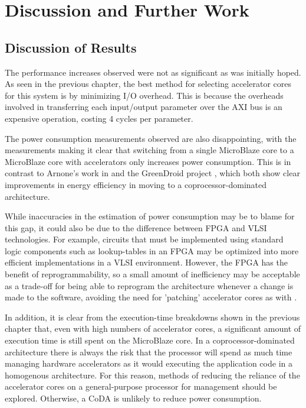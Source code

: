 \documentclass{UoYCSproject}
\begin{document}
\chapter{Discussion and Further Work}

\section{Discussion of Results}

The performance increases observed were not as significant as was initially hoped.
As seen in the previous chapter, the best method for selecting accelerator cores for this system is by minimizing
I/O overhead. This is because the overheads involved in transferring each input/output parameter over the AXI bus is an
expensive operation, costing 4 cycles per parameter.

The power consumption measurements observed are also disappointing, with the measurements making it clear that
switching from a single MicroBlaze core to a MicroBlaze core with accelerators only increases power consumption.
This is in contrast to Arnone's work in \cite{arnone-thesis} and the GreenDroid project \cite{greendroid},
which both show clear improvements in energy efficiency in moving to a coprocessor-dominated architecture.

While inaccuracies in the estimation of power consumption may be to blame for this gap, it could also be due to
the difference between FPGA and VLSI technologies. For example, circuits that must be implemented using standard
logic components such as lookup-tables in an FPGA may be optimized into more efficient implementations in a VLSI environment.
However, the FPGA has the benefit of reprogrammability, so a small amount of inefficiency may be acceptable as a trade-off for
being able to reprogram the architecture whenever a change is made to the software, avoiding the need for 'patching' accelerator
cores as with \cite{greendroid}.

In addition, it is clear from the execution-time breakdowns shown in the previous chapter that, even with high numbers
of accelerator cores, a significant amount of execution time is still spent on the MicroBlaze core. In a coprocessor-dominated
architecture there is always the risk that the processor will spend as much time managing hardware accelerators as it would
executing the application code in a homogenous architecture. For this reason, methods of reducing the reliance of the
accelerator cores on a general-purpose processor for management should be explored. Otherwise, a CoDA is unlikely to reduce
power consumption.
\end{document}
